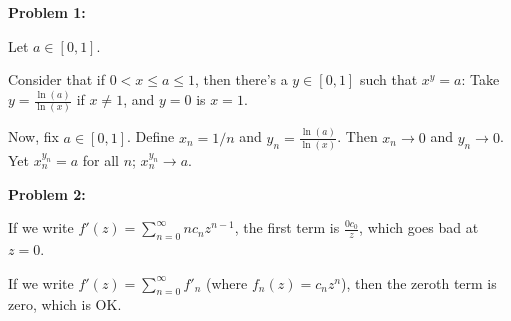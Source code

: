 \documentclass[a4paper,12pt]{article}
\begin{document}
{\bf Problem 1:}

Let $a \in [0,1]$.

Consider that if $0 < x \leq a \leq 1$, then there's a $y \in [0,1]$ such that $x^y = a$: Take $y = \frac{\ln(a)}{\ln(x)}$ if $x \neq 1$, and $y = 0$ is $x = 1$. 

Now, fix $a \in [0,1]$. Define $x_n = 1/n$ and $y_n = \frac{\ln(a)}{\ln(x)}$. Then $x_n \to 0$ and $y_n \to 0$. Yet $x_n^{y_n} = a$ for all $n$; $x_n^{y_n} \to  a$.

\shunt

{\bf Problem 2:}

If we write $f'(z) = \sum\limits_{n=0}^\infty nc_n z^{n-1}$, the first term is $\frac{0 c_0}{z}$, which goes bad at $z=0$. 

If we write $f'(z) = \sum\limits_{n=0}^\infty f'_n$ (where $f_n(z) = c_nz^n$), then the zeroth term is zero, which is OK.

\shunt
\end{document}
